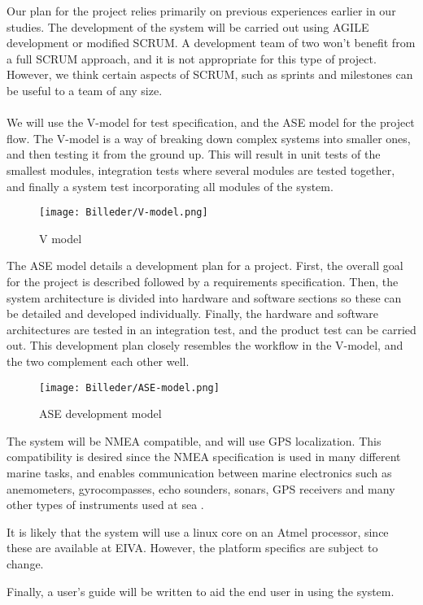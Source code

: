Our plan for the project relies primarily on previous experiences earlier in our studies. The development of the system will be carried out using AGILE development or modified SCRUM. A development team of two won't benefit from a full SCRUM approach, and it is not appropriate for this type of project. However, we think certain aspects of SCRUM, such as sprints and milestones can be useful to a team of any size. \\ \\We will use the V-model for test specification, and the ASE model for the project flow. The V-model is a way of breaking down complex systems into smaller ones, and then testing it from the ground up. This will result in unit tests of the smallest modules, integration tests where several modules are tested together, and finally a system test incorporating all modules of the system. 


\begin{figure}[H]
	\centering
	\texttt{[image: Billeder/V-model.png]}
	\caption{V model\cite{V-model}}
	\label{fig:V model}
\end{figure}


The ASE model details a development plan for a project. First, the overall goal for the project is described followed by a requirements specification. Then, the system architecture is divided into hardware and software sections so these can be detailed and developed individually. Finally, the hardware and software architectures are tested in an integration test, and the product test can be carried out. This development plan closely resembles the workflow in the V-model, and the two complement each other well.


\begin{figure}[H]
	\centering
	\texttt{[image: Billeder/ASE-model.png]}
	\caption{ASE development model\cite{ASE-model}}
	\label{fig:ASE_model}
\end{figure}


The system will be NMEA compatible, and will use GPS localization. This compatibility is desired since the NMEA specification is used in many different marine tasks, and enables communication between marine electronics such as anemometers, gyrocompasses, echo sounders, sonars, GPS receivers and many other types of instruments used at sea \cite{NMEA}.

It is likely that the system will use a linux core on an Atmel processor, since these are available at EIVA. However, the platform specifics are subject to change.

Finally, a user's guide will be written to aid the end user in using the system.